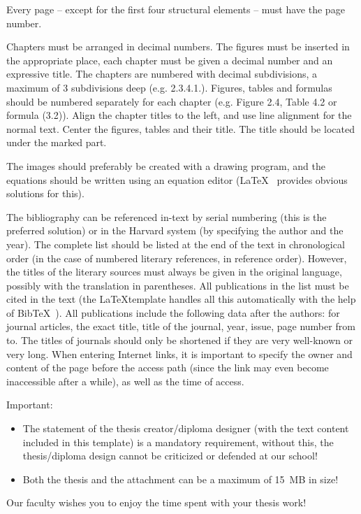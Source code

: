 Every page -- except for the first four structural elements -- must have the page number.

Chapters must be arranged in decimal numbers. The figures must be inserted in the appropriate place, each chapter must be given a decimal number and an expressive title. The chapters are numbered with decimal subdivisions, a maximum of 3 subdivisions deep (e.g. 2.3.4.1.). Figures, tables and formulas should be numbered separately for each chapter (e.g. Figure 2.4, Table 4.2 or formula (3.2)). Align the chapter titles to the left, and use line alignment for the normal text. Center the figures, tables and their title. The title should be located under the marked part.

The images should preferably be created with a drawing program, and the equations should be written using an equation editor (\LaTeX~ provides obvious solutions for this).

The bibliography can be referenced in-text by serial numbering (this is the preferred solution) or in the Harvard system (by specifying the author and the year). The complete list should be listed at the end of the text in chronological order (in the case of numbered literary references, in reference order). However, the titles of the literary sources must always be given in the original language, possibly with the translation in parentheses. All publications in the list must be cited in the text (the \LaTeX template handles all this automatically with the help of Bib\TeX~). All publications include the following data after the authors: for journal articles, the exact title, title of the journal, year, issue, page number from to. The titles of journals should only be shortened if they are very well-known or very long. When entering Internet links, it is important to specify the owner and content of the page before the access path (since the link may even become inaccessible after a while), as well as the time of access.

\vspace{5mm}
Important:
\begin{itemize}
	\item The statement of the thesis creator/diploma designer (with the text content included in this template) is a mandatory requirement, without this, the thesis/diploma design cannot be criticized or defended at our school!
	\item Both the thesis and the attachment can be a maximum of 15~MB in size!
\end{itemize}

\vspace{5mm}
\begin{center}
Our faculty wishes you to enjoy the time spent with your thesis work!
\end{center}

\normalsize
\selectthesislanguage
